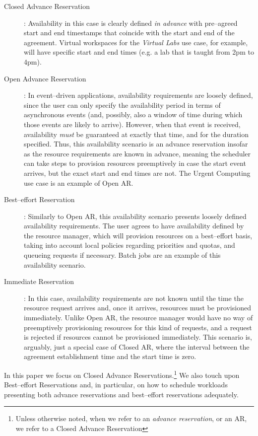 \begin{description}
\item[Closed Advance Reservation]: Availability in this case is clearly defined \emph{in advance} with pre--agreed start and end timestamps that coincide with the start and end of the agreement. Virtual workspaces for the \emph{Virtual Labs} use case, for example, will have specific start and end times (e.g. a lab that is taught from 2pm to 4pm).
\item[Open Advance Reservation]: In event--driven applications, availability requirements are loosely defined, since the user can only specify the availability period in terms of asynchronous events (and, possibly, also a window of time during which those events are likely to arrive). However, when that event is received, availability \emph{must} be guaranteed at exactly that time, and for the duration specified. Thus, this availability scenario is an advance reservation insofar as the resource requirements are known in advance, meaning the scheduler can take steps to  provision resources preemptively in case the start event arrives, but the exact start and end times are not. The Urgent Computing use case is an example of Open AR.
\item[Best--effort Reservation]: Similarly to Open AR, this availability scenario presents loosely defined availability requirements. The user agrees to have availability defined by the resource manager, which will provision resources on a best--effort basis, taking into account local policies regarding priorities and quotas, and queueing requests if necessary. Batch jobs are an example of this availability scenario.
\item[Immediate Reservation]: In this case, availability requirements are not known until the time the resource request arrives and, once it arrives, resources must be  provisioned immediately. Unlike Open AR, the resource manager would have no way of preemptively provisioning resources for this kind of requests, and a request is rejected if resources cannot be  provisioned immediately. This scenario is, arguably, just a special case of Closed AR, where the interval between the agreement establishment time and the start time is zero.
\end{description}

In this paper we focus on Closed Advance Reservations.\footnote{Unless otherwise noted, when we refer to an \emph{advance reservation}, or an AR, we refer to a Closed Advance Reservation} We also touch upon Best--effort Reservations and, in particular, on how to schedule workloads presenting both advance reservations and best--effort reservations adequately.
